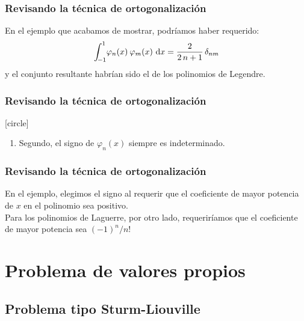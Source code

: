 \documentclass[12pt]{beamer}
\begin{document}
\begin{frame}
\frametitle{Revisando la técnica de ortogonalización}
En el ejemplo que acabamos de mostrar, podríamos haber requerido:
\pause
\begin{align}
\scaleint{5ex}_{\bs -1}^{1} \varphi_{n} (x) \: \varphi_{m} (x) \, \dd{x} = \dfrac{2}{2 \, n +1} \, \delta_{nm}
\label{eq:ecuacion_10_61}
\end{align}
y el conjunto resultante habrían sido el de los polinomios de Legendre.
\end{frame}
\begin{frame}
\frametitle{Revisando la técnica de ortogonalización}
[circle]
\begin{enumerate}[<+->]  
\conti
\item Segundo, el signo de $\varphi_{n} (x)$ siempre es indeterminado.
\end{enumerate}
\end{frame}
\begin{frame}
\frametitle{Revisando la técnica de ortogonalización}
En el ejemplo, elegimos el signo al requerir que el coeficiente de mayor potencia de $x$ en el polinomio sea positivo. 
\\
\bigskip
\pause
Para los polinomios de Laguerre, por otro lado, requeriríamos que el coeficiente de mayor potencia sea $(-1)^{n}/n!$
\end{frame}

\section{Problema de valores propios}
\subsection{Problema tipo Sturm-Liouville}
\end{document}
